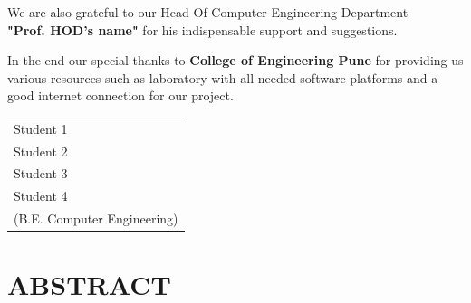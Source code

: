\documentclass{report} %
\makeatletter
\newcommand\frontpagestyle{\cleardoublepage\pagestyle{front}\let\ps@plain\ps@front}
\makeatother
\begin{document}
	We are also grateful to our Head Of Computer Engineering Department \\
	\textbf {"Prof. HOD's name"} for his indispensable support and suggestions. \\
	\vspace{\baselineskip}
	
	In the end our special thanks to \textbf {College of Engineering Pune} for providing us various resources such as laboratory with all needed software platforms and a good internet connection for our project. \\
	\vspace{5cm}
	
	\hfill
	\begin{tabular}{l}
		\hspace*{1.3cm} Student 1 \\
		\hspace*{1.3cm} Student 2 \\
		\hspace*{1.3cm} Student 3 \\
		\hspace*{1.3cm} Student 4 \\
		(B.E. Computer Engineering)
	\end{tabular}
	\pagebreak

	
	\setcounter{page}{1}
	\thispagestyle{plain}
	\centering
	\section*{ABSTRACT}
	\vspace{0.5cm}
		
	\large
	\justifying
	\paragraph{}
	\lipsum[1-3]
	\pagebreak

	\frontpagestyle %
	\tableofcontents
	\listoffigures
	\listoftables
	\pagebreak

	
\end{document}
